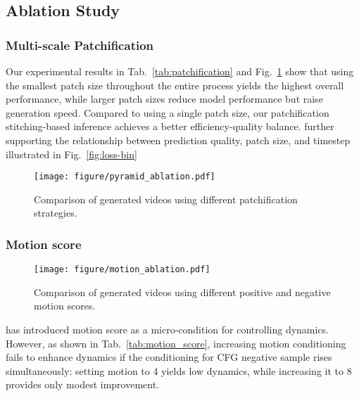 \subsection{Ablation Study}



\subsubsection{Multi-scale Patchification}

Our experimental results in Tab.~\ref{tab:patchification} and Fig.~\ref{fig:patch-size} show that using the smallest patch size throughout the entire process yields the highest overall performance, while larger patch sizes reduce model performance but raise generation speed. Compared to using a single patch size, our patchification stitching-based inference achieves a better efficiency-quality balance. further supporting the relationship between prediction quality, patch size, and timestep illustrated in Fig.~\ref{fig:loss-bin}
\begin{figure}[t]
    \centering
    \texttt{[image: figure/pyramid\_ablation.pdf]}
    \vspace{-2em}
    \caption{Comparison of generated videos using different patchification strategies.}
    \label{fig:patch-size}
    \vspace{-1em}
\end{figure}

\subsubsection{Motion score}
\label{sec:exp_motion}

\begin{figure}[t]
    \centering
    \texttt{[image: figure/motion\_ablation.pdf]}
    \vspace{-2em}
    \caption{Comparison of generated videos using different positive and negative motion scores.}
    \label{fig:motion}
\end{figure}

\sysname{} has introduced motion score as a micro-condition for controlling dynamics. However, as shown in Tab.~\ref{tab:motion_score}, increasing motion conditioning fails to enhance dynamics if the conditioning for CFG negative sample rises simultaneously: setting motion to 4 yields low dynamics, while increasing it to 8 provides only modest improvement.

